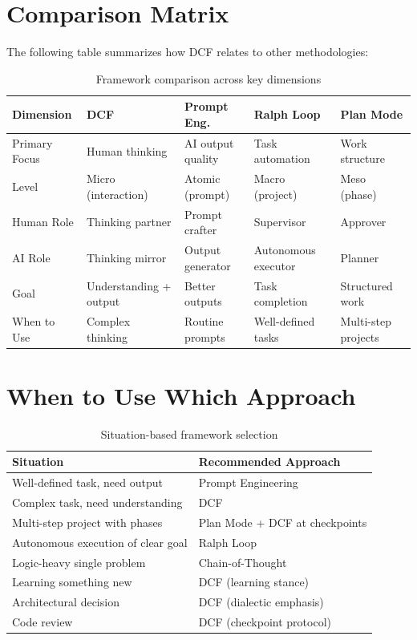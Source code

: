 \section{Comparison Matrix}

The following table summarizes how DCF relates to other methodologies:

\begin{table}[H]
\centering
\small
\begin{tabular}{p{2.2cm}p{2.5cm}p{2.5cm}p{2.5cm}p{2.5cm}}
\toprule
\textbf{Dimension} & \textbf{DCF} & \textbf{Prompt Eng.} & \textbf{Ralph Loop} & \textbf{Plan Mode} \\
\midrule
Primary Focus & Human thinking & AI output quality & Task automation & Work structure \\
Level & Micro (interaction) & Atomic (prompt) & Macro (project) & Meso (phase) \\
Human Role & Thinking partner & Prompt crafter & Supervisor & Approver \\
AI Role & Thinking mirror & Output generator & Autonomous executor & Planner \\
Goal & Understanding + output & Better outputs & Task completion & Structured work \\
When to Use & Complex thinking & Routine prompts & Well-defined tasks & Multi-step projects \\
\bottomrule
\end{tabular}
\caption{Framework comparison across key dimensions}
\end{table}

\section{When to Use Which Approach}

\begin{table}[H]
\centering
\begin{tabular}{p{6cm}p{6cm}}
\toprule
\textbf{Situation} & \textbf{Recommended Approach} \\
\midrule
Well-defined task, need output & Prompt Engineering \\
Complex task, need understanding & DCF \\
Multi-step project with phases & Plan Mode + DCF at checkpoints \\
Autonomous execution of clear goal & Ralph Loop \\
Logic-heavy single problem & Chain-of-Thought \\
Learning something new & DCF (learning stance) \\
Architectural decision & DCF (dialectic emphasis) \\
Code review & DCF (checkpoint protocol) \\
\bottomrule
\end{tabular}
\caption{Situation-based framework selection}
\end{table}

